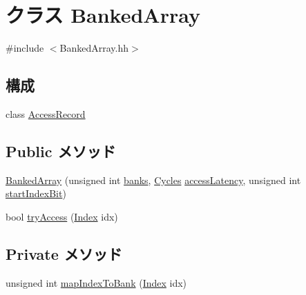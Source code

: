 \hypertarget{classBankedArray}{
\section{クラス BankedArray}
\label{classBankedArray}
}


{\ttfamily \#include $<$BankedArray.hh$>$}\subsection*{構成}
\begin{DoxyCompactItemize}
\item 
class \hyperlink{classBankedArray_1_1AccessRecord}{AccessRecord}
\end{DoxyCompactItemize}
\subsection*{Public メソッド}
\begin{DoxyCompactItemize}
\item 
\hyperlink{classBankedArray_acc56123dfcfdbbbee495007c8f90d8a3}{BankedArray} (unsigned int \hyperlink{classBankedArray_af3bc5dde442d2943c967e6a619b651db}{banks}, \hyperlink{classCycles}{Cycles} \hyperlink{classBankedArray_a22569642d188db2401013daf3c1aaf80}{accessLatency}, unsigned int \hyperlink{classBankedArray_aaf805bffe08ab5ee80012f43977189b7}{startIndexBit})
\item 
bool \hyperlink{classBankedArray_aaa85fb1f3c3aa637e08af3002b00111d}{tryAccess} (\hyperlink{TypeDefines_8hh_a39642de41f3574937f399f4fab25ba18}{Index} idx)
\end{DoxyCompactItemize}
\subsection*{Private メソッド}
\begin{DoxyCompactItemize}
\item 
unsigned int \hyperlink{classBankedArray_aab452493f7e91865f85df9ff3fe64bbc}{mapIndexToBank} (\hyperlink{TypeDefines_8hh_a39642de41f3574937f399f4fab25ba18}{Index} idx)
\end{DoxyCompactItemize}

